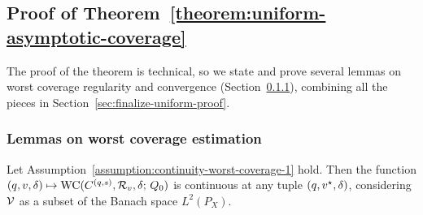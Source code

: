 \subsection{Proof of Theorem~\ref{theorem:uniform-asymptotic-coverage}}
\label{sec:proof-uniform-asymptotic-coverage}

The proof of the theorem is technical, so we
state and prove several lemmas on worst coverage regularity and convergence
(Section~\ref{sec:lemmes-worst-coverage-and-direction-recovery}), combining
all the pieces in Section~\ref{sec:finalize-uniform-proof}.

\subsubsection{Lemmas on worst coverage estimation}
\label{sec:lemmes-worst-coverage-and-direction-recovery}



\begin{lemma}
  \label{lem:continuous-distribution-vs-worst-coverage-continuity}
  Let Assumption~\ref{assumption:continuity-worst-coverage-1} hold.  Then
  the function $(q, v, \delta) \mapsto \textup{WC}( C^{(q,s)}, \mathcal{R}_v,
  \delta; \, Q_0) $ is continuous at any tuple $(q,v^\star, \delta)$,  considering $\mathcal{V}$ as a subset of the Banach space $L^2(P_X)$.
\end{lemma}

